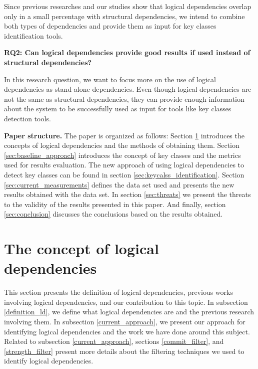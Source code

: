 \documentclass[runningheads]{comsis2}
\begin{document}
Since previous researches and our studies show that logical dependencies overlap only in a small percentage with structural dependencies, we intend to combine both types of dependencies and provide them as input for key classes identification tools.

\textbf{RQ2: Can logical dependencies provide good results if used instead of structural dependencies?}

In this research question, we want to focus more on the use of logical dependencies as stand-alone dependencies. Even though logical dependencies are not the same as structural dependencies, they can provide enough information about the system to be successfully used as input for tools like key classes detection tools. 

\textbf{Paper structure.} The paper is organized as follows: Section \ref{ld_def} introduces the concepts of logical dependencies and the methods of obtaining them. Section \ref{sec:baseline_approach} introduces the concept of key classes and the metrics used for results evaluation. The new approach of using logical dependencies to detect key classes can be found in section \ref{sec:keycalss_identification}. Section \ref{sec:current_measurements} defines the data set used and presents the new results obtained with the data set. In section \ref{sec:threats} we present the threats to the validity of the results presented in this paper. And finally, section \ref{sec:conclusion} discusses the conclusions based on the results obtained. 




\section{The concept of logical dependencies}
\label{ld_def}
This section presents the definition of logical dependencies, previous works involving logical dependencies, and our contribution to this topic. In subsection \ref{definition_ld}, we define what logical dependencies are and the previous research involving them. In subsection \ref{current_approach}, we present our approach for identifying logical dependencies and the work we have done around this subject. Related to subsection \ref{current_approach}, sections \ref{commit_filter}, and \ref{strength_filter} present more details about the filtering techniques we used to identify logical dependencies.
\end{document}
